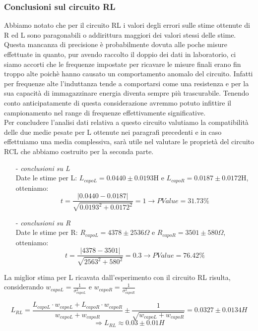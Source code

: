 \documentclass{article}
\theoremstyle{definition}
\begin{document}
\subsubsection{Conclusioni sul circuito RL}
\noindent Abbiamo notato che per il circuito RL i valori degli errori sulle stime ottenute di R ed L sono paragonabili o addirittura maggiori dei valori stessi delle stime. Questa mancanza di precisione è probabilmente dovuta alle poche misure effettuate in quanto, pur avendo raccolto il doppio dei dati in laboratorio, ci siamo accorti che le frequenze impostate per ricavare le misure finali erano fin troppo alte poichè hanno causato un comportamento anomalo del circuito. Infatti per frequenze alte l'induttanza tende a comportarsi come una resistenza e per la sua capacità di immagazzinare energia diventa sempre più trascurabile. Tenendo conto anticipatamente di questa considerazione avremmo potuto infittire il campionamento nel range di frequenze effettivamente significative. \\

\noindent Per concludere l'analisi dati relativa a questo circuito valutiamo la compatibilità delle due medie pesate per L ottenute nei paragrafi precedenti e in caso effettuiamo una media complessiva, sarà utile nel valutare le proprietà del circuito RCL che abbiamo costruito per la seconda parte. \\
\begin{enumerate}
    \item[-]\textit{conclusioni su L}\\
    \noindent Date le stime per L: \(L_{capoL} = 0.0440 \pm 0.0193\)H e \(L_{capoR} = 0.0187 \pm  0.0172\)H, otteniamo:
\[t = \frac{\left| 0.0440 - 0.0187 \right|}{\sqrt{0.0193^{2} + 0.0172^{2}}} = 1 \rightarrow PValue = 31.73\%\]

    \item[-]\textit{conclusioni su R}\\
    \noindent Date le stime per R: \(R_{capoL} = 4378 \pm 2536 \Omega\) e \(R_{capoR} = 3501 \pm 580 \Omega\), otteniamo:
\[t = \frac{\left| 4378 - 3501  \right|}{\sqrt{2563^{2} + 580^{2}}} = 0.3 \rightarrow PValue = 76.42 \%\]
\end{enumerate}


\noindent La miglior stima per L ricavata dall'esperimento con il circuito RL  risulta, considerando \(w_{capoL} = \frac{1}{\sigma^{2}_{capoL}}\) e \(w_{capoR} = \frac{1}{\sigma^{2}_{capoR}}\)

\[L_{RL} = \frac{L_{capoL}\cdot w_{capoL}+ L_{capoR}\cdot w_{capoR}}{w_{capoL} + w_{capoR}} \pm \frac{1}{\sqrt{w_{capoL} + w_{capoR}}} = 0.0327 \pm 0.0134 H \]
\[\Rightarrow  L_{RL}\approx 0.03 \pm 0.01 H\]
\end{document}
